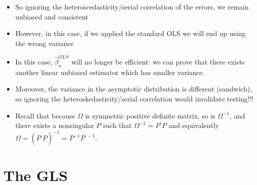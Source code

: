 \documentclass[notes=show]{beamer}
\begin{document}
\begin{frame}%


\begin{itemize}
\item So ignoring the heteroscedasticity/serial correlation of the errors,
we remain unbiased and consistent

\item However, in this case, if we applied the standard OLS we will end up
using the wrong variance

\item In this case, $\widehat{\beta }_{n}^{OLS}$ will no longer be
efficient: we can prove that there exists another linear unbiased estimator
which has smaller variance.

\item Moreover, the variance in the asymptotic distribution is different
(sandwich), so ignoring the heteroskedasticity/serial correlation would
invalidate testing!!!

\item Recall that because $\Omega $ is symmetric positive definite matrix,
so is $\Omega ^{-1}$, and there exists a nonsingular $P$ such that $\Omega
^{-1}=P^{\prime }P$ and equivalently $\Omega =(P^{^{\prime
}}P)^{-1}=P^{-1}P^{\prime -1}.$
\end{itemize}

\end{frame}%

\section{The GLS}
\end{document}
